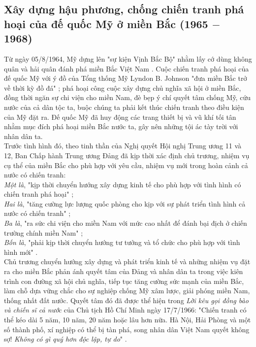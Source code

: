 \subsection{Xây dựng hậu phương, chống chiến tranh phá hoại của đế quốc Mỹ ở miền Bắc (1965 $-$ 1968)}
Từ ngày 05/8/1964, Mỹ dựng lên "sự kiện Vịnh Bắc Bộ" nhằm lấy cớ dùng không quân và hải quân đánh phá miền Bắc Việt Nam \nocite{skvbb}. Cuộc chiến tranh phá hoại của đế quốc Mỹ với ý đồ của Tổng thống Mỹ Lyndon B. Johnson "đưa miền Bắc trở về thời kỳ đồ đá" \supercite{giaotrinh}; phá hoại công cuộc xây dựng chủ nghĩa xã hội ở miền Bắc, đồng thời ngăn sự chi viện cho miền Nam, đè bẹp ý chí quyết tâm chống Mỹ, cứu nước của cả dân tộc ta, buộc chúng ta phải kết thúc chiến tranh theo điều kiện của Mỹ đặt ra. Đế quốc Mỹ đã huy động các trang thiết bị và vũ khí tối tân nhằm mục đích phá hoại miền Bắc nước ta, gây nên những tội ác tày trời với nhân dân ta.\\
Trước tình hình đó, theo tinh thần của Nghị quyết Hội nghị Trung ương 11 và 12, Ban Chấp hành Trung ương Đảng đã kịp thời xác định chủ trương, nhiệm vụ cụ thể của miền Bắc cho phù hợp với yêu cầu, nhiệm vụ mới trong hoàn cảnh cả nước có chiến tranh:\\
\textit{Một là}, "kịp thời chuyển hướng xây dựng kinh tế cho phù hợp với tình hình có chiến tranh phá hoại" \supercite{giaotrinh};\\
\textit{Hai là}, "tăng cường lực lượng quốc phòng cho kịp với sự phát triển tình hình cả nước có chiến tranh" \supercite{giaotrinh};\\
\textit{Ba là}, "ra sức chi viện cho miền Nam với mức cao nhất để đánh bại địch ở chiến trường chính miền Nam" \supercite{giaotrinh};\\
\textit{Bốn là}, "phải kịp thời chuyển hướng tư tưởng và tổ chức cho phù hợp với tình hình mới" \supercite{giaotrinh}.\\
Chủ trương chuyển hướng xây dựng và phát triển kinh tế và những nhiệm vụ đặt ra cho miền Bắc phản ánh quyết tâm của Đảng và nhân dân ta trong việc kiên trình con đường xã hội chủ nghĩa, tiếp tục tăng cường sức mạnh của miền Bắc, làm chỗ dựa vững chắc cho sự nghiệp chống Mỹ xâm lược, giải phóng miền Nam, thống nhất đất nước. Quyết tâm đó đã được thể hiện trong \textit{Lời kêu gọi đồng bào và chiến sĩ cả nước} của Chủ tịch Hồ Chí Minh ngày 17/7/1966: "Chiến tranh có thể kéo dài 5 năm, 10 năm, 20 năm hoặc lâu hơn nữa. Hà Nội, Hải Phòng và một số thành phố, xí nghiệp có thể bị tàn phá, song nhân dân Việt Nam quyết không sợ! \textit{Không có gì quý hơn độc lập, tự do}" \supercite{HCMtt15}.\\
